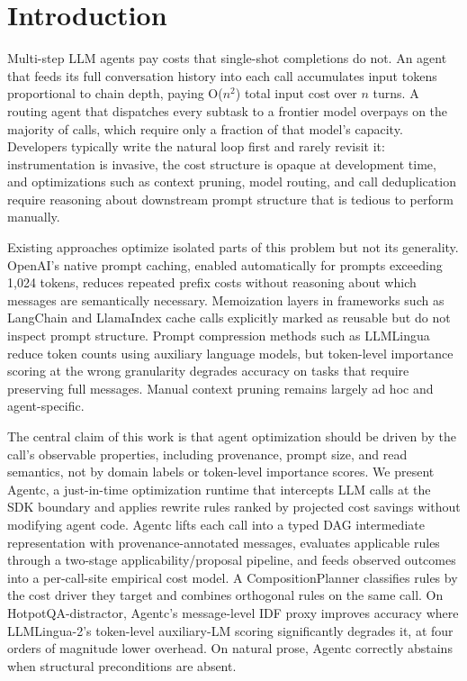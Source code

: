 \section{Introduction}

Multi-step LLM agents pay costs that single-shot completions do not. An agent that
feeds its full conversation history into each call accumulates input tokens
proportional to chain depth, paying O($n^2$) total input cost over $n$ turns. A
routing agent that dispatches every subtask to a frontier model overpays on the
majority of calls, which require only a fraction of that model's capacity. Developers
typically write the natural loop first and rarely revisit it: instrumentation is
invasive, the cost structure is opaque at development time, and optimizations such as
context pruning, model routing, and call deduplication require reasoning about
downstream prompt structure that is tedious to perform manually.

Existing approaches optimize isolated parts of this problem but not its generality.
OpenAI's native prompt caching, enabled automatically for prompts exceeding 1,024
tokens, reduces repeated prefix costs without reasoning about which messages are
semantically necessary. Memoization layers in frameworks such as LangChain and
LlamaIndex cache calls explicitly marked as reusable but do not inspect prompt
structure. Prompt compression methods such as LLMLingua~\cite{jiang2023llmlingua}
reduce token counts using auxiliary language models, but token-level importance
scoring at the wrong granularity degrades accuracy on tasks that require preserving
full messages. Manual context pruning remains largely ad hoc and agent-specific.

The central claim of this work is that agent optimization should be driven by
the call's observable properties, including provenance, prompt size, and read
semantics, not by domain labels or token-level importance scores. We present Agentc, a
just-in-time optimization runtime that intercepts LLM calls at the SDK boundary and
applies rewrite rules ranked by projected cost savings without modifying agent code.
Agentc lifts each call into a typed DAG intermediate representation with
provenance-annotated messages, evaluates applicable rules through a two-stage
applicability/proposal pipeline, and feeds observed outcomes into a per-call-site
empirical cost model. A CompositionPlanner classifies rules by the cost driver they
target and combines orthogonal rules on the same call. On HotpotQA-distractor, Agentc's
message-level IDF proxy improves accuracy where LLMLingua-2's token-level auxiliary-LM
scoring significantly degrades it, at four orders of magnitude lower overhead. On
natural prose, Agentc correctly abstains when structural preconditions are absent.

